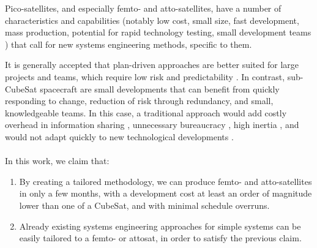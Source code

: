 \documentclass[]{iac}
\def\todo#1{}
\begin{document}
    Pico-satellites, and especially femto- and atto-satellites, have a number of characteristics and capabilities (notably low cost, small size, fast development, mass production, potential for rapid technology testing, small development teams \autocite{hein_attosats_2019}) that call for new systems engineering methods, specific to them.
    
    It is generally accepted that plan-driven approaches are better suited for large projects and teams, which require low risk and predictability \autocite[Sec. 2]{boehm_balancing_2004}. In contrast, sub-CubeSat spacecraft are small developments that can benefit from quickly responding to change, reduction of risk through redundancy, and small, knowledgeable teams. In this case, a traditional approach would add costly overhead in information sharing \autocite{yassine_information_2003}, unnecessary bureaucracy \autocite{boehm_balancing_2004}, high inertia \autocite{carson_421_2013}, and would not adapt quickly to new technological developments \autocite{sebok}.

    \paragraph{}

    In this work, we claim that:
    \begin{enumerate}[label={\alph*)},itemsep=0pt]
        \item By creating a tailored methodology, we can produce femto- and atto-satellites in only a few months, with a development cost at least an order of magnitude lower \todo{how to give evidence?} than one of a CubeSat, and with minimal schedule overruns.
        \item Already existing systems engineering approaches for simple systems can be easily tailored to a femto- or attosat, in order to satisfy the previous claim.
    \end{enumerate}  %
    

\end{document}
